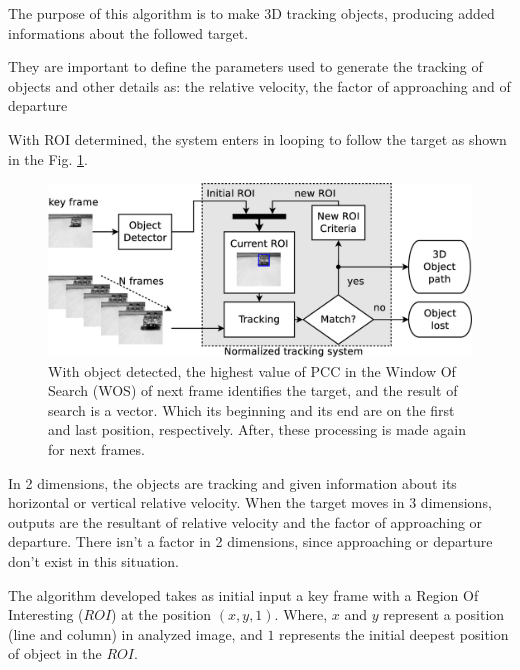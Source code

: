 The purpose of this algorithm is to make 3D tracking objects, producing added informations 
about the followed target.


They are important to define the parameters used to generate the tracking of 
objects and other details as: the relative velocity, the factor of 
approaching and of departure

With ROI determined, the system enters in looping to follow the target as shown 
in the Fig. \ref{fig:system}.


\begin{figure}[bhp]
\includegraphics[width=\columnwidth]{images/figure1-diagram1.eps}
\caption{With object detected, the highest value of PCC in the Window Of Search 
(WOS) of next frame identifies the target, 
and the result of search is a vector. 
Which its beginning and its end are on the first and last position, respectively. 
After, these processing is made again for 
next frames.}
\label{fig:system}
\end{figure}

In 2 dimensions, the objects are tracking and given information about its horizontal 
or vertical relative velocity.
When the target moves in 3 dimensions, outputs are the resultant of relative 
velocity and the factor of approaching or departure. 
There isn't a factor in 2 dimensions, since approaching or departure don't exist 
in this situation.

The algorithm developed takes as initial input a key frame with a Region Of 
Interesting ($ROI$) at the position $(x,y,1)$.
Where, $x$ and $y$ represent a position (line and column) in analyzed image,
and $1$ represents the initial deepest position of object in the $ROI$.

